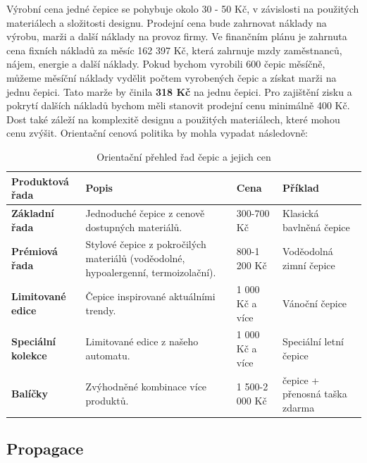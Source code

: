 \documentclass[12pt, a4paper]{article}
\begin{document}
\vspace{10pt}

\noindent Výrobní cena jedné čepice se pohybuje okolo 30 - 50 Kč, v závislosti na použitých materiálech a složitosti designu.
Prodejní cena bude zahrnovat náklady na výrobu, marži a další náklady na provoz firmy.
Ve finančním plánu je zahrnuta cena fixních nákladů za měsíc 162 397 Kč, která zahrnuje mzdy zaměstnanců, nájem, energie a další náklady.
Pokud bychom vyrobili 600 čepic měsíčně, můžeme měsíční náklady vydělit počtem vyrobených čepic a získat marži na jednu čepici.
Tato marže by činila \textbf{318 Kč} na jednu čepici. Pro zajištění zisku a pokrytí dalších nákladů bychom měli stanovit prodejní cenu minimálně 400 Kč.
Dost také záleží na komplexitě designu a použitých materiálech, které mohou cenu zvýšit.
Orientační cenová politika by mohla vypadat následovně:

\renewcommand{\arraystretch}{1.2}

\begin{table}[h]
  \centering
  \begin{tabularx}{\textwidth}{ |>{\raggedright\arraybackslash}X||>{\raggedright\arraybackslash}X|X|>{\raggedright\arraybackslash}X| }
    \hline
    \textbf{Produktová řada} & \textbf{Popis} & \textbf{Cena} & \textbf{Příklad} \\
    \hline
    \hline
    \textbf{Základní řada} 
    & Jednoduché čepice z cenově dostupných materiálů. 
    & 300-700 Kč 
    & Klasická bavlněná čepice \\
    \hline
    \textbf{Prémiová řada} 
    & Stylové čepice z pokročilých materiálů (voděodolné, hypoalergenní, termoizolační). 
    & 800-1 200 Kč 
    & Voděodolná zimní čepice \\
    \hline
    \textbf{Limitované edice} 
    & Čepice inspirované aktuálními trendy. 
    & 1 000 Kč a více 
    & Vánoční čepice \\
    \hline
    \textbf{Speciální kolekce} 
    & Limitované edice z našeho automatu. 
    & 1 000 Kč a více 
    & Speciální letní čepice \\
    \hline
    \textbf{Balíčky} 
    & Zvýhodněné kombinace více produktů. 
    & 1 500-2 000 Kč 
    & 2 čepice + přenosná taška zdarma \\
    \hline
  \end{tabularx}
  \caption{Orientační přehled řad čepic a jejich cen}
\end{table}

\pagebreak

\subsection{Propagace}
\end{document}
